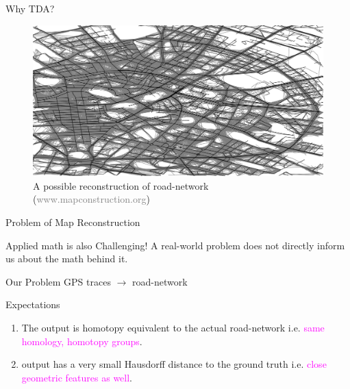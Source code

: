 \documentclass[10pt,sans-serif]{beamer}
\begin{document}
\begin{frame}{Why TDA?}
  \begin{figure}
    \centering
    \includegraphics[scale=0.3]{Berlin_Recon}
    \caption{A possible reconstruction of road-network
      (\textcolor{gray}{www.mapconstruction.org})}
  \end{figure}
\end{frame}


\begin{frame}{Problem of Map Reconstruction}
  \begin{block}{Applied math is also Challenging!}
    A real-world problem does not directly inform us about the math behind it.
  \end{block}

  \pause
    \begin{block}{Our Problem}
    GPS traces $\to$ road-network
  \end{block}

  \pause
  
  \begin{block}{Expectations}
    \begin{enumerate}
    \item The output is homotopy equivalent to the actual road-network
      i.e. \textcolor{magenta}{same homology, homotopy groups}.
    \item output has a very small Hausdorff distance to the ground truth i.e.
      \textcolor{magenta}{close geometric features as well}.
    \end{enumerate}
  \end{block}
\end{frame}
\end{document}
